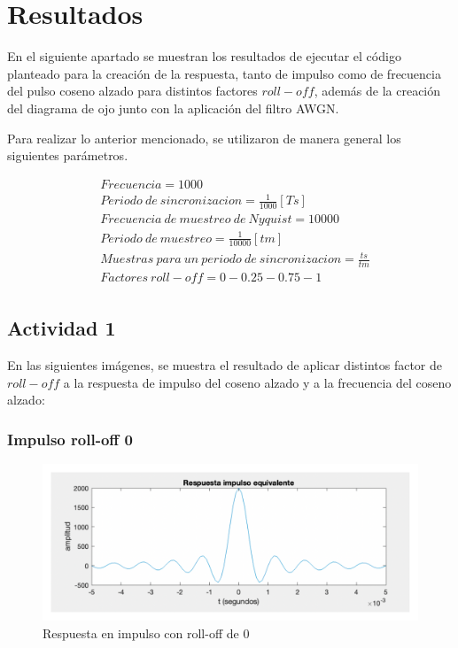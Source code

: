 \section{Resultados}\label{sec:resultados}

En el siguiente apartado se muestran los resultados de ejecutar el código planteado para la creación de la respuesta, tanto de impulso como de frecuencia del pulso coseno alzado para distintos factores $roll-off$, además de la creación del diagrama de ojo junto con la aplicación del filtro AWGN.

Para realizar lo anterior mencionado, se utilizaron de manera general los siguientes parámetros.

\begin{equation}\label{eq:frecuencia coseno alzado}
    \begin{split} 
    &Frecuencia =  1000\\
    &Periodo\ de\ sincronizacion = \frac{1}{1000}  [Ts] \\
    &Frecuencia\ de\ muestreo\ de\ Nyquist = 10000\\
    &Periodo\ de\ muestreo = \frac{1}{10000} [tm] \\
    &Muestras\ para\ un\ periodo\ de\ sincronizacion = \frac{ts}{tm}\\
    &Factores\ roll-off = 0-0.25-0.75-1\\
    \end{split} 
\end{equation} 


\subsection{Actividad 1 }

En las siguientes imágenes, se muestra el resultado de aplicar distintos factor de $roll-off$ a la respuesta de impulso del coseno alzado y a la frecuencia del coseno alzado:


\subsubsection{Impulso roll-off 0} \phantom{text} %
\begin{figure}[H]
    \centering
    \includegraphics[scale=0.22]{Imagenes/act 2/frecuenciarollof0.pdf}
    \caption{Respuesta en impulso  con roll-off de 0}
    \label{fig:Respuesta en frecuencia  con roll-off de 0}
\end{figure}


